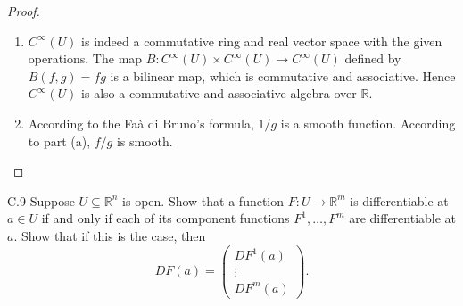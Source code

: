 \begin{proof}
\begin{enumerate}[itemsep=0pt,label={(\alph*)}]
              so \( f + g, c f \) is smooth.

              For every \( 1 \le j \le n \)
              \begingroup
              \allowdisplaybreaks%
              \begin{align*}
                    & \lim\limits_{h \to 0} \dfrac{f(\ldots, x^{j} + h, \ldots)g(\ldots, x^{j} + h, \ldots) - f(\ldots, x^{j}, \ldots)g(\ldots, x^{j}, \ldots)}{h}     \\
                  = & \lim\limits_{h \to 0} \dfrac{f(\ldots, x^{j} + h, \ldots)g(\ldots, x^{j} + h, \ldots) - f(\ldots, x^{j} + h, \ldots)g(\ldots, x^{j}, \ldots)}{h} \\
                    & + \lim\limits_{h \to 0} \dfrac{f(\ldots, x^{j} + h, \ldots)g(\ldots, x^{j}, \ldots) - f(\ldots, x^{j}, \ldots)g(\ldots, x^{j}, \ldots)}{h}       \\
                  = & f\dfrac{\partial g}{\partial x^{j}} + g\dfrac{\partial f}{\partial x^{j}}.
              \end{align*}
              \endgroup

              Therefore \( fg \in C^{1} \). In general, for every \( k \)
              \[
                  \dfrac{\partial^{k} fg}{\partial x^{i_{k}} \cdots \partial x^{i_{1}}} = \sum \dfrac{\partial^{m} f}{\partial x^{i_{a(m)}} \cdots \partial x^{i_{a(1)}}} \dfrac{\partial^{k-m}g}{\partial x^{i_{b(k-m)}}\cdots \partial x^{i_{b(1)}}}
              \]

              where \( a(1) < \cdots < a(m); b(1) < \cdots < b(k - m) \) and
              \[
                  \left\{ a(1), \ldots, a(m), b(1), \ldots, b(k-m) \right\} = \left\{ 1, \ldots, k \right\}.
              \]

              Thus \( fg \) is smooth.
        \item \( C^{\infty}(U) \) is indeed a commutative ring and real vector space with the given operations. The map \( B: C^{\infty}(U) \times C^{\infty}(U) \to C^{\infty}(U) \) defined by \( B(f, g) = fg \) is a bilinear map, which is commutative and associative. Hence \( C^{\infty}(U) \) is also a commutative and associative algebra over \( \mathbb{R} \).
        \item According to the Fa\`{a} di Bruno's formula, \( 1/g \) is a smooth function. According to part (a), \( f/g \) is smooth.
    \end{enumerate}
\end{proof}


\begin{exercise}{C.9}
    Suppose \( U \subseteq \mathbb{R}^{n} \) is open. Show that a function \( F: U \to \mathbb{R}^{m} \) is differentiable at \( a \in U \) if and only if each of its component functions \( F^{1}, \ldots, F^{m} \) are differentiable at \( a \). Show that if this is the case, then
    \[
        DF(a) = \begin{pmatrix} DF^{1}(a) \\ \vdots \\ DF^{m}(a) \end{pmatrix}.
    \]
\end{exercise}


